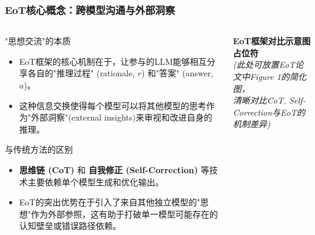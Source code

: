 \documentclass[aspectratio=169]{beamer} %
\begin{document}
\begin{frame}[allowframebreaks]
\frametitle{EoT核心概念：跨模型沟通与外部洞察}
\begin{columns}
\begin{column}{0.6\textwidth}
\begin{block}{"思想交流"的本质}
    \begin{itemize}
        \item EoT框架的核心机制在于，让参与的LLM能够相互分享各自的"推理过程" (rationale, $r$) 和"答案" (answer, $a$)。
        \item 这种信息交换使得每个模型可以将其他模型的思考作为"外部洞察"(external insights)来审视和改进自身的推理。
    \end{itemize}
\end{block}

\begin{block}{与传统方法的区别}
    \begin{itemize}
        \item \textbf{思维链 (CoT)} 和 \textbf{自我修正 (Self-Correction)} 等技术主要依赖单个模型生成和优化输出。
        \item EoT的突出优势在于引入了来自其他独立模型的"思想"作为外部参照，这有助于打破单一模型可能存在的认知壁垒或错误路径依赖。
    \end{itemize}
\end{block}
\end{column}
\begin{column}{0.4\textwidth}
    \vspace{1cm} %
    \begin{center}
        \textbf{EoT框架对比示意图占位符}\\
        \textit{(此处可放置EoT论文中Figure 1的简化图，\\清晰对比CoT, Self-Correction与EoT的机制差异)}
    \end{center}
\end{column}
\end{columns}
\end{frame}
\end{document}
